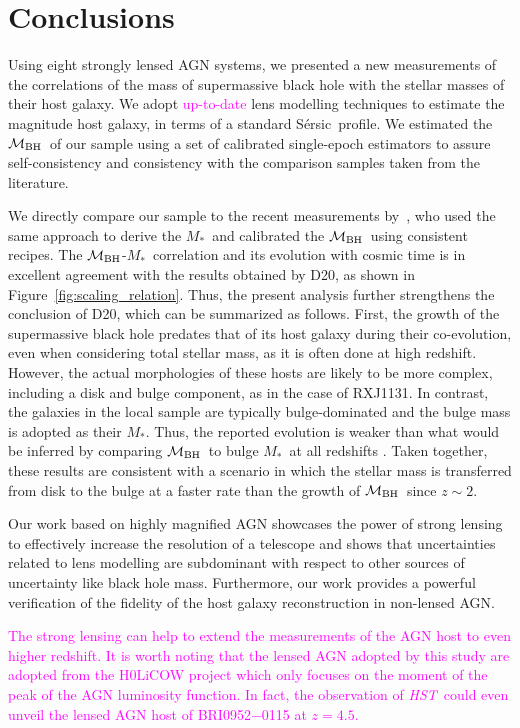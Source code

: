 \documentclass[fleqn,usenatbib]{mnras}
\newcommand{\hst}{{\it HST}}
\newcommand{\mbh}{$\mathcal M_{\rm BH}$}
\newcommand{\sersic}{S\'ersic}
\newcommand{\mstar}{{$M_*$}}
\newcommand{\pink}[1]{{\textcolor{magenta}{#1}}}
\begin{document}
\section{Conclusions}\label{sec:con}
Using eight strongly lensed AGN systems, we presented a new measurements of the correlations of the mass of supermassive black hole with the stellar masses of their host galaxy. We adopt \pink{up-to-date} lens modelling techniques to estimate the magnitude host galaxy, in terms of a standard \sersic\ profile. We estimated the \mbh\ of our sample using a set of calibrated single-epoch estimators to assure self-consistency and consistency with the comparison samples taken from the literature.

We directly compare our sample to the recent measurements by~\citet[][D20]{Ding2020a}, who used the same approach to derive the \mstar\ and calibrated the \mbh\ using consistent recipes. The \mbh-\mstar\ correlation and its evolution with cosmic time is in excellent agreement with the results obtained by D20, as shown in Figure~\ref{fig:scaling_relation}. Thus, the present analysis further strengthens the conclusion of D20, which can be summarized as follows. First, the growth of the supermassive black hole predates that of its host galaxy during their co-evolution, even when considering total stellar mass, as it is often done at high redshift. However, the actual morphologies of these hosts are likely to be more complex, including a disk and bulge component, as in the case of  RXJ1131. In contrast, the galaxies in the local sample are typically bulge-dominated and the bulge mass is adopted as their  \mstar. Thus, the reported evolution is weaker than what would be inferred by comparing \mbh\ to bulge \mstar\ at all redshifts \citep{Bennert++2011}. Taken together, these results are consistent with a scenario in which the stellar mass is transferred from disk to the bulge at a faster rate than the growth of \mbh\ since $z\sim2$.

Our work based on highly magnified AGN showcases the power of strong lensing to effectively increase the resolution of a telescope and shows that uncertainties related to lens modelling are subdominant with respect to other sources of uncertainty like black hole mass. Furthermore, our work provides a powerful verification of the fidelity of the host galaxy reconstruction in non-lensed AGN. 

\pink{The strong lensing can help to extend the measurements of the AGN host to even higher redshift. It is worth noting that the lensed AGN adopted by this study are adopted from the H0LiCOW project which only focuses on the moment of the peak of the AGN luminosity function. In fact, the observation of \hst\ could even unveil the lensed AGN host of  BRI0952$-$0115 at $z=4.5$.}
\end{document}
